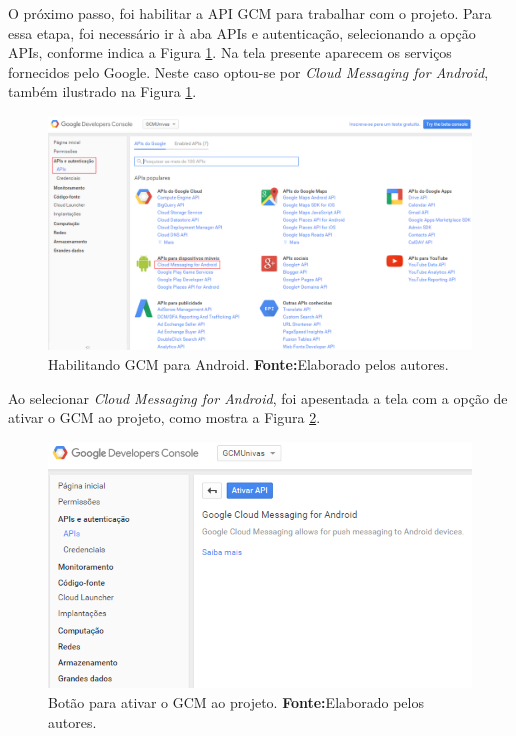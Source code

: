 	\par O próximo passo, foi habilitar a API GCM para trabalhar com o projeto.
Para essa etapa, foi necessário ir à aba APIs e autenticação, selecionando a
opção APIs, conforme indica a Figura \ref{fig:gcm4}. Na tela presente aparecem
os serviços fornecidos pelo Google. Neste caso optou-se por \textit{Cloud
Messaging for Android}, também ilustrado na Figura \ref{fig:gcm4}.

	\begin{figure}[h!] 
		\centerline{\includegraphics[scale=0.4]{./imagens/2_q_metodologico/4_procedimentos_resultados/41_gcm/gcm4.png}}
		\caption[Habilitando GCM para Android]{Habilitando GCM para Android.
		\textbf{Fonte:}Elaborado pelos autores.}
		\label{fig:gcm4}
	\end{figure}
	
	\par Ao selecionar \textit{Cloud Messaging for Android}, foi apesentada a
tela com a opção de ativar o GCM ao projeto, como mostra a Figura \ref{fig:gcm5}.

	\begin{figure}[h!] 
		\centerline{\includegraphics[scale=0.66]{./imagens/2_q_metodologico/4_procedimentos_resultados/41_gcm/gcm5.png}}
		\caption[Botão para ativar o GCM ao projeto]{Botão para ativar o GCM ao projeto.
		\textbf{Fonte:}Elaborado pelos autores.}
		\label{fig:gcm5}
	\end{figure}
	
